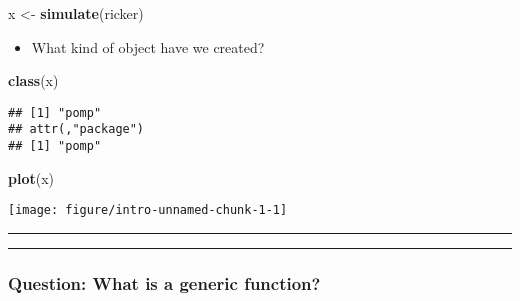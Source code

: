 \documentclass[]{article}
\newenvironment{Shaded}{\begin{snugshade}}{\end{snugshade}}
\newcommand{\KeywordTok}[1]{\textcolor[rgb]{0.13,0.29,0.53}{\textbf{#1}}}
\newcommand{\StringTok}[1]{\textcolor[rgb]{0.31,0.60,0.02}{#1}}
\newcommand{\NormalTok}[1]{#1}
\providecommand{\tightlist}{%
  \setlength{\itemsep}{0pt}\setlength{\parskip}{0pt}}
\begin{document}
\begin{Shaded}
\begin{Highlighting}[]
\NormalTok{x <-}\StringTok{ }\KeywordTok{simulate}\NormalTok{(ricker)}
\end{Highlighting}
\end{Shaded}

\begin{itemize}
\tightlist
\item
  What kind of object have we created?
\end{itemize}

\begin{Shaded}
\begin{Highlighting}[]
\KeywordTok{class}\NormalTok{(x)}
\end{Highlighting}
\end{Shaded}

\begin{verbatim}
## [1] "pomp"
## attr(,"package")
## [1] "pomp"
\end{verbatim}

\begin{Shaded}
\begin{Highlighting}[]
\KeywordTok{plot}\NormalTok{(x)}
\end{Highlighting}
\end{Shaded}

\begin{center}\texttt{[image: figure/intro-unnamed-chunk-1-1]} \end{center}

\begin{center}\rule{0.5\linewidth}{\linethickness}\end{center}

\begin{center}\rule{0.5\linewidth}{\linethickness}\end{center}

\subsubsection{Question: What is a generic
function?}\label{question-what-is-a-generic-function}
\end{document}
